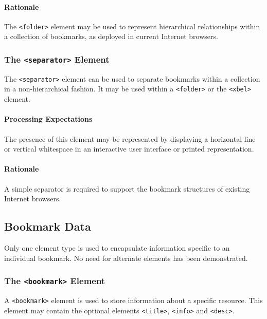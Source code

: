 \documentclass{howto}
\newcommand{\element}[1]{\texttt{<#1>}}
\begin{document}
      \paragraph*{Rationale}
        The \element{folder} element may be used to represent
        hierarchical relationships within a collection of bookmarks,
        as deployed in current Internet browsers.

    \subsubsection{The \element{separator} Element
                   \label{element-separator}}

      The \element{separator} element can be used to separate
      bookmarks within a collection in a non-hierarchical fashion.  It 
      may be used within a \element{folder} or the \element{xbel}
      element.

      \paragraph*{Processing Expectations}
        The presence of this element may be represented by displaying
        a horizontal line or vertical whitespace in an interactive
        user interface or printed representation.

      \paragraph*{Rationale}
        A simple separator is required to support the bookmark
        structures of existing Internet browsers.

  \subsection{Bookmark Data
              \label{bookmark-data}}

    Only one element type is used to encapsulate information specific
    to an individual bookmark.  No need for alternate elements has
    been demonstrated.

    \subsubsection{The \element{bookmark} Element
                   \label{element-bookmark}}

      A \element{bookmark} element is used to store information about
      a specific resource.  This element may contain the optional
      elements \element{title}, \element{info} and \element{desc}.
\end{document}
